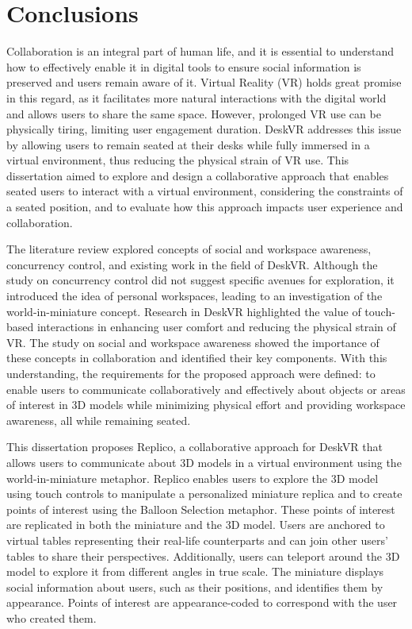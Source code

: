 \chapter{Conclusions} \label{chap:concl}

    Collaboration is an integral part of human life, and it is essential to understand how to effectively enable it in digital tools to ensure social information is preserved and users remain aware of it. Virtual Reality (VR) holds great promise in this regard, as it facilitates more natural interactions with the digital world and allows users to share the same space. However, prolonged VR use can be physically tiring, limiting user engagement duration. DeskVR addresses this issue by allowing users to remain seated at their desks while fully immersed in a virtual environment, thus reducing the physical strain of VR use. This dissertation aimed to explore and design a collaborative approach that enables seated users to interact with a virtual environment, considering the constraints of a seated position, and to evaluate how this approach impacts user experience and collaboration.

    The literature review explored concepts of social and workspace awareness, concurrency control, and existing work in the field of DeskVR. Although the study on concurrency control did not suggest specific avenues for exploration, it introduced the idea of personal workspaces, leading to an investigation of the world-in-miniature concept. Research in DeskVR highlighted the value of touch-based interactions in enhancing user comfort and reducing the physical strain of VR. The study on social and workspace awareness showed the importance of these concepts in collaboration and identified their key components. With this understanding, the requirements for the proposed approach were defined: to enable users to communicate collaboratively and effectively about objects or areas of interest in 3D models while minimizing physical effort and providing workspace awareness, all while remaining seated.

    This dissertation proposes Replico, a collaborative approach for DeskVR that allows users to communicate about 3D models in a virtual environment using the world-in-miniature metaphor. Replico enables users to explore the 3D model using touch controls to manipulate a personalized miniature replica and to create points of interest using the Balloon Selection metaphor. These points of interest are replicated in both the miniature and the 3D model. Users are anchored to virtual tables representing their real-life counterparts and can join other users' tables to share their perspectives. Additionally, users can teleport around the 3D model to explore it from different angles in true scale. The miniature displays social information about users, such as their positions, and identifies them by appearance. Points of interest are appearance-coded to correspond with the user who created them.

